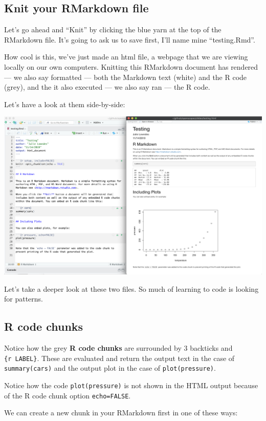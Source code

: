 \documentclass[]{book}
\begin{document}
\hypertarget{knit-your-rmarkdown-file}{%
\subsection{Knit your RMarkdown file}\label{knit-your-rmarkdown-file}}

Let's go ahead and ``Knit'' by clicking the blue yarn at the top of the RMarkdown file. It's going to ask us to save first, I'll name mine ``testing.Rmd''.

How cool is this, we've just made an html file, a webpage that we are viewing locally on our own computers. Knitting this RMarkdown document has rendered --- we also say formatted --- both the Markdown text (white) and the R code (grey), and the it also executed --- we also say ran --- the R code.

Let's have a look at them side-by-side:

\includegraphics[width=0.8\linewidth]{img/rmarkdown_side_by_side}

Let's take a deeper look at these two files. So much of learning to code is looking for patterns.

\hypertarget{r-code-chunks}{%
\subsection{R code chunks}\label{r-code-chunks}}

Notice how the grey \textbf{R code chunks} are surrounded by 3 backticks and \texttt{\{r\ LABEL\}}. These are evaluated and return the output text in the case of \texttt{summary(cars)} and the output plot in the case of \texttt{plot(pressure)}.

Notice how the code \texttt{plot(pressure)} is not shown in the HTML output because of the R code chunk option \texttt{echo=FALSE}.

We can create a new chunk in your RMarkdown first in one of these ways:
\end{document}
